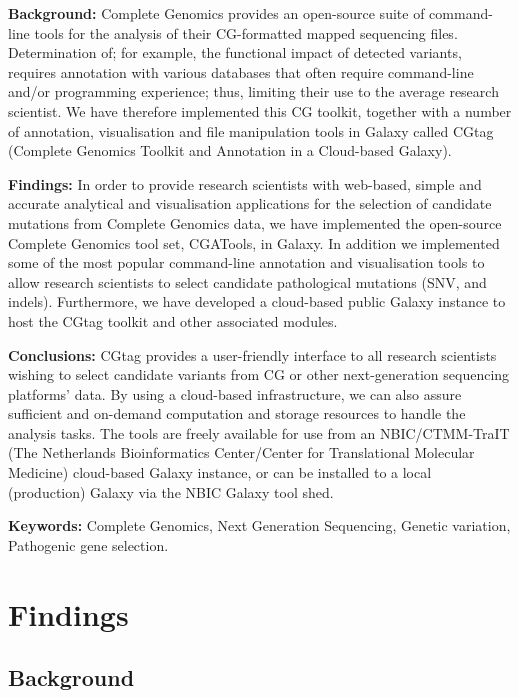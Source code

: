 \textbf{Background:} Complete Genomics provides an open-source suite of command-line tools for the analysis of their CG-formatted mapped sequencing files. Determination of; for example, the functional impact of detected variants, requires annotation with various databases that often require command-line and/or programming experience; thus, limiting their use to the average research scientist. We have therefore implemented this CG toolkit, together with a number of annotation, visualisation and file manipulation tools in Galaxy called CGtag (Complete Genomics Toolkit and Annotation in a Cloud-based Galaxy).


\textbf{Findings:} In order to provide research scientists with web-based, simple and accurate analytical and visualisation applications for the selection of candidate mutations from Complete Genomics data, we have implemented the open-source Complete Genomics tool set, CGATools, in Galaxy. In addition we implemented some of the most popular command-line annotation and visualisation tools to allow research scientists to select candidate pathological mutations (SNV, and indels). Furthermore, we have developed a cloud-based public Galaxy instance to host the CGtag toolkit and other associated modules.

\textbf{Conclusions:} CGtag provides a user-friendly interface to all research scientists wishing to select candidate variants from CG or other next-generation sequencing platforms’ data. By using a cloud-based infrastructure, we can also assure sufficient and on-demand computation and storage resources to handle the analysis tasks. The tools are freely available for use from an NBIC/CTMM-TraIT (The Netherlands Bioinformatics Center/Center for Translational Molecular Medicine) cloud-based Galaxy instance, or can be installed to a local (production) Galaxy via the NBIC Galaxy tool shed.

\textbf{Keywords:} Complete Genomics, Next Generation Sequencing, Genetic variation, Pathogenic gene selection.



\section*{Findings }

\subsection*{Background}

